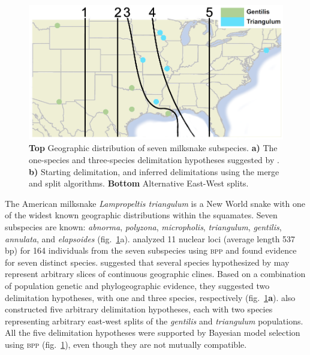 \documentclass{article1}
\newcommand{\blue}[1]{{\color{blue}{#1}}}
\begin{document}
\begin{figure}[h!]
    \includegraphics[scale=0.30]{figs/Lampro/EW} %
    
    \caption{
    \textbf{Top} Geographic distribution of seven milksnake subspecies. 
    \textbf{a)} The one-species and three-species delimitation hypotheses suggested by \citet{Chambers2020}.
    \textbf{b)} Starting delimitation, and inferred delimitations using the merge and
    split algorithms. 
    \textbf{Bottom} Alternative East-West splits.
    \blue{[Updated figure to use custom image, and match colours]} %
	} \label{fig:milksnake}
\end{figure} 

The American milksnake \textit{Lampropeltis triangulum} is a New World snake with one of
the widest known geographic distributions within the squamates.  Seven subspecies are
known: \textit{abnorma}, \textit{polyzona}, \textit{micropholis}, \textit{triangulum},
\textit{gentilis}, \textit{annulata}, and \textit{elapsoides} (fig.~\ref{fig:milksnake}a).
\citet{Ruane2014} analyzed 11 nuclear loci (average length 537 bp) for 164 individuals
from the seven subspecies using \textsc{bpp} and found evidence for seven distinct
species.  \citet{Chambers2020} suggested that several species hypothesized by
\citet{Ruane2014} may represent arbitrary slices of continuous geographic clines.  Based
on a combination of population genetic and phylogeographic evidence, they suggested two
delimitation hypotheses, with one and three species, respectively
(fig.~\ref{fig:milksnake}\textbf{a}).  \citet{Chambers2020} also constructed five
arbitrary delimitation hypotheses, each with two species representing arbitrary east-west
splits of the \textit{gentilis} and \textit{triangulum} populations.  All the five
delimitation hypotheses were supported by Bayesian model selection using \textsc{bpp}
(fig.~\ref{fig:milksnake}), even though they are not mutually compatible.
\end{document}
